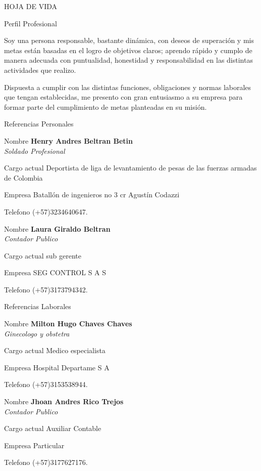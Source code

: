 \documentclass[letterpaper,12pt]{article}
\begin{document}
\begin{cv}{HOJA DE VIDA}
\begin{cvlist}{Perfil Profesional}
	\item {Soy una persona responsable, bastante dinámica, con deseos de superación y mis metas están basadas en el logro de objetivos claros; aprendo rápido y cumplo de manera adecuada con puntualidad, honestidad y responsabilidad en las distintas actividades que realizo.
 
Dispuesta a cumplir con las distintas funciones, obligaciones y normas laborales que tengan establecidas, me presento con gran entusiasmo a su empresa para formar parte del cumplimiento de metas planteadas en su misión.}
	
\end{cvlist}

\begin{cvlist}{Referencias Personales}

\item[Nombre]\textbf{ Henry Andres Beltran Betin}\\
\emph{ Soldado Profesional}
	\item[Cargo actual]Deportista de liga de levantamiento de pesas de las  fuerzas armadas de Colombia 
	\item[Empresa] Batallón de ingenieros no 3 cr Agustín Codazzi	
	\item[Telefono](+57)3234640647.

\item[Nombre]\textbf{Laura Giraldo Beltran}\\
\emph{Contador Publico} 
	\item[Cargo actual] sub gerente
	\item[Empresa] SEG CONTROL S A S
	\item[Telefono](+57)3173794342.

\end{cvlist}

\begin{cvlist}{Referencias Laborales }

\item[Nombre]\textbf{ Milton Hugo Chaves Chaves}\\
\emph{Ginecologo y obstetra}
	\item[Cargo actual] Medico especialista
	\item[Empresa] Hospital Departame S A
	\item[Telefono](+57)3153538944.

\item[Nombre]\textbf{Jhoan Andres Rico Trejos}\\
\emph{Contador Publico}
	\item[Cargo actual] Auxiliar Contable
	\item[Empresa]Particular
	\item[Telefono](+57)3177627176.


\end{cvlist}

\end{cv}
\end{document}
